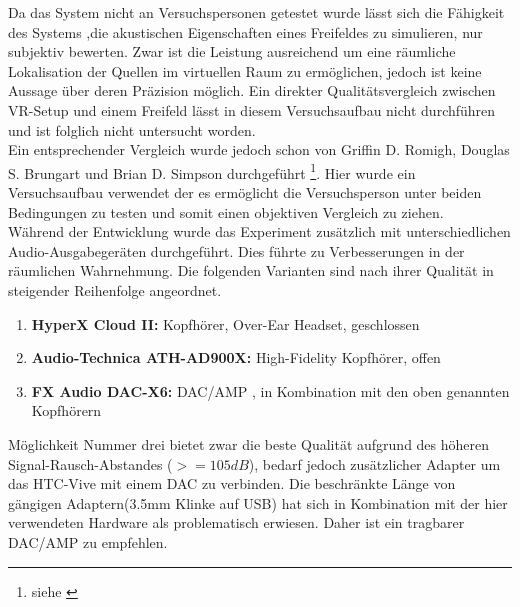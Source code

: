 

Da das System nicht an Versuchspersonen getestet wurde lässt sich die Fähigkeit des Systems ,die akustischen Eigenschaften eines Freifeldes zu simulieren, nur subjektiv bewerten.
Zwar ist die Leistung ausreichend um eine räumliche Lokalisation der Quellen im virtuellen Raum zu ermöglichen, jedoch ist keine Aussage über deren Präzision möglich.
Ein direkter Qualitätsvergleich zwischen VR-Setup und einem Freifeld lässt in diesem Versuchsaufbau nicht durchführen und ist folglich nicht untersucht worden.\\
Ein entsprechender Vergleich wurde jedoch schon von Griffin D. Romigh, Douglas S. Brungart und Brian D. Simpson durchgeführt \footnote{siehe \cite{FFC}}. Hier wurde ein Versuchsaufbau verwendet der es ermöglicht die Versuchsperson unter beiden Bedingungen zu testen und somit einen objektiven Vergleich zu ziehen.\\
Während der Entwicklung wurde das Experiment zusätzlich mit unterschiedlichen Audio-Ausgabegeräten durchgeführt. Dies führte zu Verbesserungen in der räumlichen Wahrnehmung.
Die folgenden Varianten sind nach ihrer Qualität in steigender Reihenfolge angeordnet.
\begin{enumerate}
\item \textbf{HyperX Cloud II:} Kopfhörer, Over-Ear Headset, geschlossen
\item \textbf{Audio-Technica ATH-AD900X:}  High-Fidelity Kopfhörer, offen
\item \textbf{FX Audio DAC-X6:} DAC/AMP , in Kombination mit den oben genannten Kopfhörern
\end{enumerate}

Möglichkeit Nummer drei bietet zwar die beste Qualität aufgrund des höheren Signal-Rausch-Abstandes ($>= 105 dB$), bedarf jedoch zusätzlicher Adapter um das HTC-Vive mit einem DAC zu verbinden. Die beschränkte Länge von gängigen Adaptern(3.5mm Klinke auf USB) hat sich in Kombination mit der hier verwendeten Hardware als problematisch erwiesen. Daher ist ein tragbarer DAC/AMP zu empfehlen. 